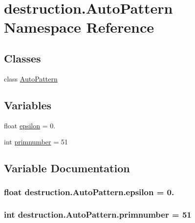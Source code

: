 \hypertarget{namespacedestruction_1_1_auto_pattern}{\section{destruction.\-Auto\-Pattern Namespace Reference}
\label{namespacedestruction_1_1_auto_pattern}
}
\subsection*{Classes}
\begin{DoxyCompactItemize}
\item 
class \hyperlink{classdestruction_1_1_auto_pattern_1_1_auto_pattern}{Auto\-Pattern}
\end{DoxyCompactItemize}
\subsection*{Variables}
\begin{DoxyCompactItemize}
\item 
float \hyperlink{namespacedestruction_1_1_auto_pattern_ab1978af4c199d374a53ce5cf590a43a6}{epsilon} = 0.
\item 
int \hyperlink{namespacedestruction_1_1_auto_pattern_aae56cae90a32f4ae94961ee5470baca6}{primnumber} = 51
\end{DoxyCompactItemize}


\subsection{Variable Documentation}
\hypertarget{namespacedestruction_1_1_auto_pattern_ab1978af4c199d374a53ce5cf590a43a6}{
\subsubsection[{epsilon}]{\setlength{\rightskip}{0pt plus 5cm}float destruction.\-Auto\-Pattern.\-epsilon = 0.}}\label{namespacedestruction_1_1_auto_pattern_ab1978af4c199d374a53ce5cf590a43a6}
\hypertarget{namespacedestruction_1_1_auto_pattern_aae56cae90a32f4ae94961ee5470baca6}{
\subsubsection[{primnumber}]{\setlength{\rightskip}{0pt plus 5cm}int destruction.\-Auto\-Pattern.\-primnumber = 51}}\label{namespacedestruction_1_1_auto_pattern_aae56cae90a32f4ae94961ee5470baca6}
